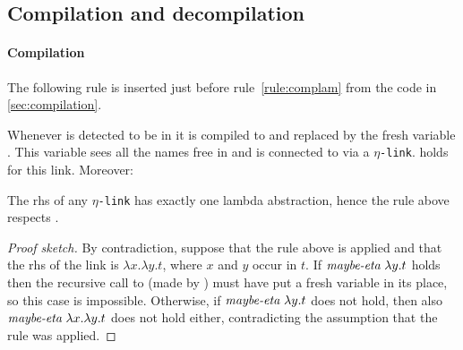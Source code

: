 \documentclass[sigconf,natbib=false,review]{acmart}
\newcommand{\appsep}{\ensuremath{\textcolor{lightgray}{\cdot}}}
\newcommand{\linkMacro}[1]{\ensuremath{#1}\texttt{-link}\xspace}
\newcommand{\linketa} {\linkMacro{\eta}}
\newcommand{\Ho}{\texorpdfstring{\ensuremath{\mathcal{M}}\xspace}{M}}
\newcommand{\rhs}{rhs\xspace}
\begin{document}

% 


\subsection{Compilation and decompilation}\label{sec:etacomp}


\paragraph{Compilation}
The following rule is inserted just before rule~\ref{rule:complam} from the code in
\cref{sec:compilation}.



\noindent
Whenever  is detected to be in
\maybeeta it is compiled to  and replaced by the fresh
variable . This variable sees all the names free in
 and is connected to  via a \linketa.
 holds for this link. Moreover:

\begin{corollary}
  The \rhs of any \linketa has exactly one lambda abstraction, hence
  the rule above respects .
  \label{cor:rhs-eta-onelamb}
\end{corollary}

\begin{proof}[Proof sketch]
  By contradiction, suppose that the rule above is applied and that
  the \rhs of the link is $\lambda x.\lambda y.t$, where $x$ and $y$ occur in $t$.
  If $\emph{maybe-eta}{}~\lambda y.t$ holds then the recursive call to
   (made by ) must have put a fresh variable
  in its place, so this case is impossible.
  Otherwise, if $\emph{maybe-eta}{}~\lambda y.t$ does not hold, then also
  $\emph{maybe-eta}{}~\lambda x.\lambda y.t$ does not hold either, contradicting
  the assumption that the rule was applied.
\end{proof}
\end{document}
